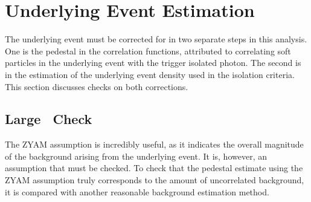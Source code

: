 \FloatBarrier

\section{Underlying Event Estimation}
The underlying event must be corrected for in two separate steps in this analysis. One is the pedestal in the correlation functions, attributed to correlating soft particles in the underlying event with the trigger isolated photon. The second is in the estimation of the underlying event density used in the isolation criteria. This section discusses checks on both corrections.

\subsection{Large \deltaeta~Check}

The ZYAM assumption is incredibly useful, as it indicates the overall magnitude of the background arising from the underlying event. It is, however, an assumption that must be checked. To check that the pedestal estimate using the ZYAM assumption truly corresponds to the amount of uncorrelated background, it is compared with another reasonable background estimation method.


